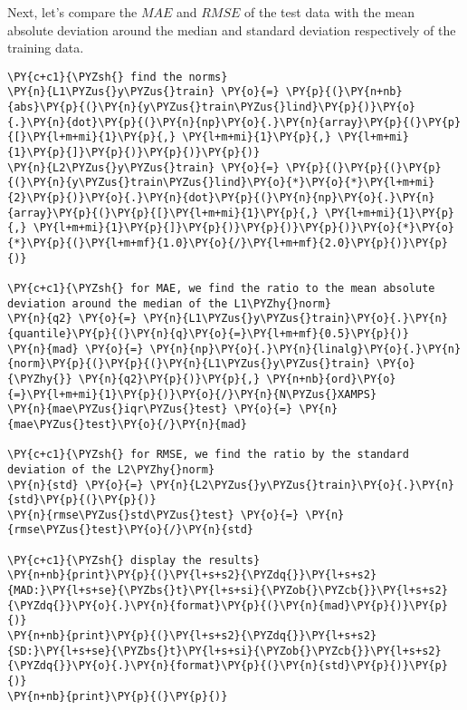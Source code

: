     Next, let's compare the \(M\!A\!E\) and \(R\!M\!S\!E\) of the test data
with the mean absolute deviation around the median and standard
deviation respectively of the training data.

    \begin{tcolorbox}[breakable, size=fbox, boxrule=1pt, pad at break*=1mm,colback=cellbackground, colframe=cellborder]
\begin{Verbatim}[commandchars=\\\{\}]
\PY{c+c1}{\PYZsh{} find the norms}
\PY{n}{L1\PYZus{}y\PYZus{}train} \PY{o}{=} \PY{p}{(}\PY{n+nb}{abs}\PY{p}{(}\PY{n}{y\PYZus{}train\PYZus{}lind}\PY{p}{)}\PY{o}{.}\PY{n}{dot}\PY{p}{(}\PY{n}{np}\PY{o}{.}\PY{n}{array}\PY{p}{(}\PY{p}{[}\PY{l+m+mi}{1}\PY{p}{,} \PY{l+m+mi}{1}\PY{p}{,} \PY{l+m+mi}{1}\PY{p}{]}\PY{p}{)}\PY{p}{)}\PY{p}{)}
\PY{n}{L2\PYZus{}y\PYZus{}train} \PY{o}{=} \PY{p}{(}\PY{p}{(}\PY{p}{(}\PY{n}{y\PYZus{}train\PYZus{}lind}\PY{o}{*}\PY{o}{*}\PY{l+m+mi}{2}\PY{p}{)}\PY{o}{.}\PY{n}{dot}\PY{p}{(}\PY{n}{np}\PY{o}{.}\PY{n}{array}\PY{p}{(}\PY{p}{[}\PY{l+m+mi}{1}\PY{p}{,} \PY{l+m+mi}{1}\PY{p}{,} \PY{l+m+mi}{1}\PY{p}{]}\PY{p}{)}\PY{p}{)}\PY{p}{)}\PY{o}{*}\PY{o}{*}\PY{p}{(}\PY{l+m+mf}{1.0}\PY{o}{/}\PY{l+m+mf}{2.0}\PY{p}{)}\PY{p}{)}

\PY{c+c1}{\PYZsh{} for MAE, we find the ratio to the mean absolute deviation around the median of the L1\PYZhy{}norm}
\PY{n}{q2} \PY{o}{=} \PY{n}{L1\PYZus{}y\PYZus{}train}\PY{o}{.}\PY{n}{quantile}\PY{p}{(}\PY{n}{q}\PY{o}{=}\PY{l+m+mf}{0.5}\PY{p}{)}
\PY{n}{mad} \PY{o}{=} \PY{n}{np}\PY{o}{.}\PY{n}{linalg}\PY{o}{.}\PY{n}{norm}\PY{p}{(}\PY{p}{(}\PY{n}{L1\PYZus{}y\PYZus{}train} \PY{o}{\PYZhy{}} \PY{n}{q2}\PY{p}{)}\PY{p}{,} \PY{n+nb}{ord}\PY{o}{=}\PY{l+m+mi}{1}\PY{p}{)}\PY{o}{/}\PY{n}{N\PYZus{}XAMPS}
\PY{n}{mae\PYZus{}iqr\PYZus{}test} \PY{o}{=} \PY{n}{mae\PYZus{}test}\PY{o}{/}\PY{n}{mad}

\PY{c+c1}{\PYZsh{} for RMSE, we find the ratio by the standard deviation of the L2\PYZhy{}norm}
\PY{n}{std} \PY{o}{=} \PY{n}{L2\PYZus{}y\PYZus{}train}\PY{o}{.}\PY{n}{std}\PY{p}{(}\PY{p}{)}
\PY{n}{rmse\PYZus{}std\PYZus{}test} \PY{o}{=} \PY{n}{rmse\PYZus{}test}\PY{o}{/}\PY{n}{std}

\PY{c+c1}{\PYZsh{} display the results}
\PY{n+nb}{print}\PY{p}{(}\PY{l+s+s2}{\PYZdq{}}\PY{l+s+s2}{MAD:}\PY{l+s+se}{\PYZbs{}t}\PY{l+s+si}{\PYZob{}\PYZcb{}}\PY{l+s+s2}{\PYZdq{}}\PY{o}{.}\PY{n}{format}\PY{p}{(}\PY{n}{mad}\PY{p}{)}\PY{p}{)}
\PY{n+nb}{print}\PY{p}{(}\PY{l+s+s2}{\PYZdq{}}\PY{l+s+s2}{SD:}\PY{l+s+se}{\PYZbs{}t}\PY{l+s+si}{\PYZob{}\PYZcb{}}\PY{l+s+s2}{\PYZdq{}}\PY{o}{.}\PY{n}{format}\PY{p}{(}\PY{n}{std}\PY{p}{)}\PY{p}{)}
\PY{n+nb}{print}\PY{p}{(}\PY{p}{)}


\end{Verbatim}
\end{tcolorbox}
